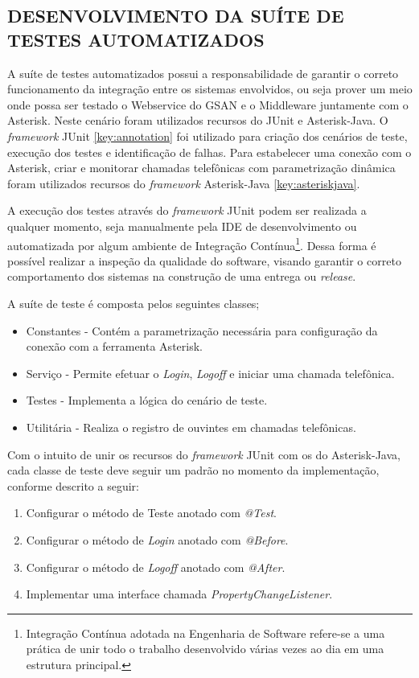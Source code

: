\subsection{\textbf{\uppercase{Desenvolvimento da Suíte de Testes Automatizados}}}

A suíte de testes automatizados possui a responsabilidade de garantir o correto funcionamento da integração entre os sistemas envolvidos, ou seja prover um meio onde possa ser testado o Webservice do GSAN e o Middleware juntamente com o Asterisk. 
Neste cenário foram utilizados recursos do JUnit e Asterisk-Java. O \textit{framework} JUnit \ref{key:annotation} foi utilizado para criação dos cenários de teste, execução dos testes e identificação de falhas. Para estabelecer uma conexão com o Asterisk, criar e monitorar chamadas telefônicas com parametrização dinâmica foram utilizados recursos do \textit{framework} Asterisk-Java \ref{key:asteriskjava}.  

A execução dos testes através do \textit{framework} JUnit podem ser realizada a qualquer momento, seja manualmente pela IDE de desenvolvimento ou automatizada por algum ambiente de Integração Contínua\footnote{Integração Contínua adotada na Engenharia de Software refere-se a uma prática de unir todo o trabalho desenvolvido várias vezes ao dia em uma estrutura principal.}. Dessa forma é possível realizar a inspeção da qualidade do software, visando garantir o correto comportamento dos sistemas na construção de uma entrega ou \textit{release}.

A suíte de teste é composta pelos seguintes classes;
\begin{itemize}
	\item Constantes - Contém a parametrização necessária para configuração da conexão com a ferramenta Asterisk.
	\item Serviço - Permite efetuar o \textit{Login}, \textit{Logoff} e iniciar uma chamada telefônica.
	\item Testes - Implementa a lógica do cenário de teste.
	\item Utilitária - Realiza o registro de ouvintes em chamadas telefônicas.
\end{itemize}


Com o intuito de unir os recursos do \textit{framework} JUnit com os do Asterisk-Java, cada classe de teste deve seguir um padrão no momento da implementação, conforme descrito a seguir:

\begin{enumerate}
	\item Configurar o método de Teste anotado com \textit{@Test}.
	\item Configurar o método de \textit{Login} anotado com \textit{@Before}.
	\item Configurar o método de \textit{Logoff} anotado com \textit{@After}.
	\item Implementar uma interface chamada \textit{PropertyChangeListener}.	
\end{enumerate}


